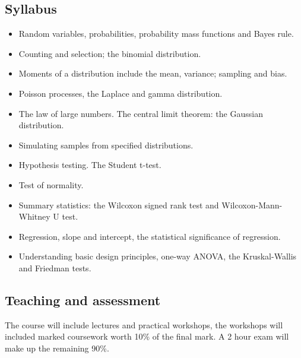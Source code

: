 \documentclass[12pt,a4paper]{scrartcl}
\begin{document}
\subsection*{Syllabus}
\begin{itemize}
\item Random variables, probabilities, probability mass functions and Bayes rule.
\item Counting and selection; the binomial distribution.
\item Moments of a distribution include the mean, variance; sampling and bias.
\item Poisson processes, the Laplace and gamma distribution.
\item The law of large numbers. The central limit theorem: the
  Gaussian distribution.
\item Simulating samples from specified distributions. 
\item Hypothesis testing. The Student t-test.
\item Test of normality.
\item Summary statistics: the Wilcoxon signed rank test and Wilcoxon-Mann-Whitney U test.
\item Regression, slope and intercept, the statistical significance of regression.
\item Understanding basic design principles, one-way ANOVA, the Kruskal-Wallis and Friedman tests.

\end{itemize}

\subsection*{Teaching and assessment}
The course will include lectures and practical workshops, the
workshops will included marked coursework worth 10\% of the final
mark. A 2 hour exam will make up the remaining 90\%.
\end{document}
